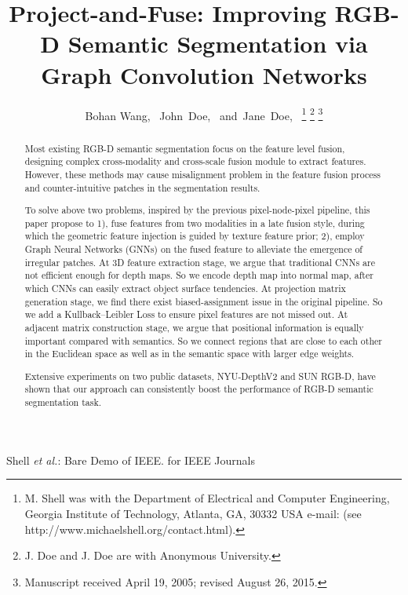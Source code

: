 ﻿\documentclass[journal]{IEEEtran}
\begin{document}


\title{Project-and-Fuse: Improving RGB-D Semantic Segmentation via Graph Convolution Networks}

\author{Bohan Wang,~
        John~Doe,~
        and~Jane~Doe,~%
\thanks{M. Shell was with the Department
of Electrical and Computer Engineering, Georgia Institute of Technology, Atlanta,
GA, 30332 USA e-mail: (see http://www.michaelshell.org/contact.html).}%
\thanks{J. Doe and J. Doe are with Anonymous University.}%
\thanks{Manuscript received April 19, 2005; revised August 26, 2015.}}

%
{Shell \MakeLowercase{\textit{et al.}}: Bare Demo of IEEE. for IEEE Journals}

\maketitle

\begin{abstract}
    Most existing RGB-D semantic segmentation focus on the feature level fusion, designing complex cross-modality and cross-scale fusion module to extract features. However, these methods may cause misalignment problem in the feature fusion process and counter-intuitive patches in the segmentation results.
    
    To solve above two problems, inspired by the previous pixel-node-pixel pipeline, this paper propose to 1), fuse features from two modalities in a late fusion style, during which the geometric feature injection is guided by texture feature prior; 2), employ Graph Neural Networks (GNNs) on the fused feature to alleviate the emergence of irregular patches. At 3D feature extraction stage, we argue that traditional CNNs are not efficient enough for depth maps. So we encode depth map into normal map, after which CNNs can easily extract object surface tendencies. At projection matrix generation stage, we find there exist biased-assignment issue in the original pipeline. So we add a Kullback–Leibler Loss to ensure pixel features are not missed out. At adjacent matrix construction stage, we argue that positional information is equally important compared with semantics. So we connect regions that are close to each other in the Euclidean space as well as in the semantic space with larger edge weights.

    Extensive experiments on two public datasets, NYU-DepthV2 and SUN RGB-D, have shown that our approach can consistently boost the performance of RGB-D semantic segmentation task.
    \end{abstract}
\end{document}
